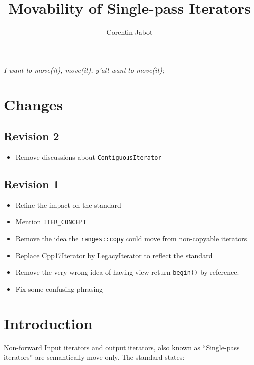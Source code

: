\documentclass{wg21}
\title{Movability of Single-pass Iterators}
\author{Corentin Jabot}{corentin.jabot@gmail.com}
\begin{document}
\maketitle

\begin{flushright}
\hfill \break
\hfill \break
\textit{I want to move(it), move(it), y'all want to move(it);}
\end{flushright}

\hypertarget{changes}{%
	\section{Changes}\label{changes}}

\hypertarget{revision-2}{%
	\subsection{Revision 2}\label{revision-2}}

\begin{itemize}
	\item
	Remove discussions about \texttt{ContiguousIterator}
\end{itemize}

\hypertarget{revision-1}{%
	\subsection{Revision 1}\label{revision-1}}

\begin{itemize}
	\item
	Refine the impact on the standard
	\item
	Mention \texttt{ITER\_CONCEPT}
	\item
	Remove the idea the \texttt{ranges::copy} could move from non-copyable
	iterators
	\item
	Replace Cpp17Iterator by LegacyIterator to reflect the standard
	\item
	Remove the very wrong idea of having view return \texttt{begin()} by
	reference.
	\item
	Fix some confusing phrasing
\end{itemize}

\hypertarget{introduction}{%
	\section{Introduction}\label{introduction}}

Non-forward Input iterators and output iterators, also known as
``Single-pass iterators'' are semantically move-only. The standard
states:
\end{document}
